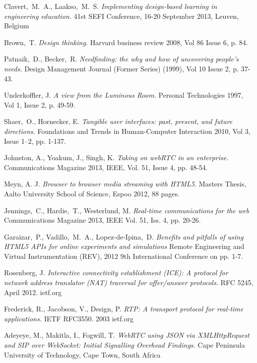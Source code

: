\documentclass[english,12pt,a4paper,pdftex]{article}
\begin{document}
\begin{thebibliography}{99}


 Clavert,\ M.\ A., Laakso,\ M.\ S. \textit{Implementing design-based learning in engineering education.} 41st SEFI Conference, 16-20 September 2013, Leuven, Belgium

 Brown,\ T. \textit{Design thinking.} Harvard business review 2008, Vol 86 Issue 6, p. 84.

 Patnaik,\ D., Becker,\ R. \textit{Needfinding: the why and how of uncovering people's needs.}   Design Management Journal (Former Series) (1999), Vol 10 Issue 2, p. 37-43.

 Underkoffler, J. \textit{A view from the Luminous Room.} Personal Technologies 1997, Vol 1, Issue 2, p. 49-59.

 Shaer,\ O.,  Hornecker, E. \textit{Tangible user interfaces: past, present, and future directions.} Foundations and Trends in Human-Computer Interaction 2010, Vol 3, Issue 1–2, pp. 1-137.

 Johnston, A., Yoakum, J., Singh, K. \textit{Taking on webRTC in an enterprise.} Communications Magazine 2013, IEEE, Vol. 51, Issue 4, pp. 48-54.

 Meyn, A. J. \textit{Browser to browser media streaming with HTML5.} Masters Thesis, Aalto University School of Science, Espoo 2012, 88 pages.

 Jennings,\ C., Hardie,\ T., Westerlund, M. \textit{Real-time communications for the web} Communications Magazine 2013, IEEE Vol. 51, Iss. 4, pp. 20-26. %

 Garaizar,\ P., Vadillo,\ M.\ A., Lopez-de-Ipina,\ D. \textit{Benefits and pitfalls of using HTML5 APIs for online experiments and simulations} Remote Engineering and Virtual Instrumentation (REV), 2012 9th International Conference on pp. 1-7. %

 Rosenberg, J. \textit{Interactive connectivity establishment (ICE): A protocol for network address translator (NAT) traversal for offer/answer protocols.} RFC 5245, April 2012. ietf.org

 Frederick, R., Jacobson, V., Design, P. \textit{RTP: A transport protocol for real-time applications.} IETF RFC3550. 2003 ietf.org

 Adeyeye, M., Makitla, I., Fogwill, T. \textit{WebRTC using JSON via XMLHttpRequest and SIP over WebSocket: Initial Signalling Overhead Findings.} Cape Peninsula University of Technology, Cape Town, South Africa

\end{thebibliography}
\end{document}
